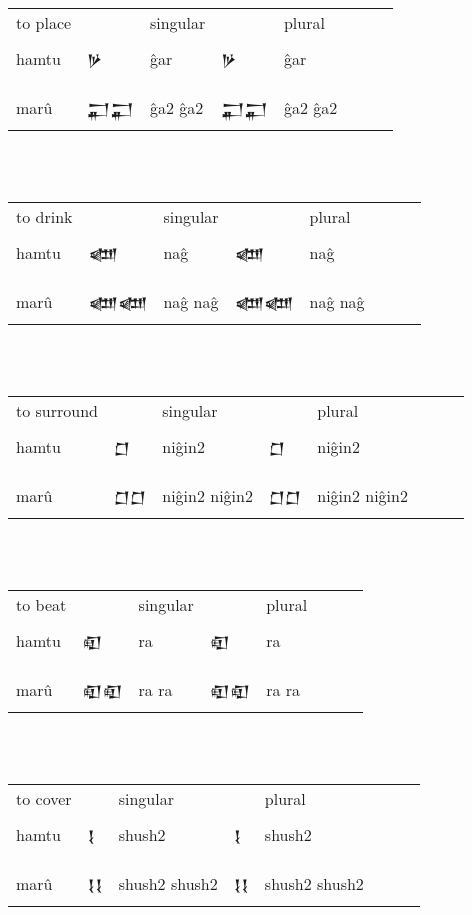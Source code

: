 \documentclass[a4paper,12pt]{book}
\newcommand{\fcm}{\large\setmainfont{Akkadian.otf}}
\begin{document}
\verb||\\
\begin{tabular}[!h]{l l l | l l l l l}
to place  && singular && plural \\
hamtu & {\fcm 𒃻}  & ĝar  & {\fcm 𒃻}  & ĝar \\
&&&&\\
  marû & {\fcm 𒂷𒂷}  & ĝa2 ĝa2 & {\fcm 𒂷𒂷}  & ĝa2 ĝa2 \\
\end{tabular}\verb||\\

\verb||\\
\begin{tabular}[!h]{l l l | l l l l l}
to drink  && singular && plural \\
  hamtu & {\fcm 𒅘}  & naĝ & {\fcm 𒅘}  & naĝ \\
&&&&\\
  marû & {\fcm 𒅘𒅘}  & naĝ naĝ & {\fcm 𒅘𒅘}  & naĝ naĝ \\
\end{tabular}\verb||\\

\verb||\\
\begin{tabular}[!h]{l l l | l l l l l}
to surround  && singular && plural \\
  hamtu & {\fcm 𒆸}  & niĝin2 & {\fcm 𒆸}   & niĝin2 \\
&&&&\\
  marû & {\fcm 𒆸𒆸}  & niĝin2 niĝin2 & {\fcm 𒆸𒆸} & niĝin2 niĝin2 \\
\end{tabular}\verb||\\


\verb||\\
\begin{tabular}[!h]{l l l | l l l l l}
to beat  && singular && plural \\
  hamtu & {\fcm 𒊏}  & ra & {\fcm 𒊏}  & ra \\
&&&&\\
  marû &{\fcm 𒊏𒊏}  & ra ra & {\fcm 𒊏𒊏}  & ra ra \\
\end{tabular}\verb||\\

\verb||\\
\begin{tabular}[!h]{l l l | l l l l l}
to cover  && singular && plural \\
  hamtu & {\fcm 𒋙}  & shush2 & {\fcm 𒋙}  & shush2 \\
&&&&\\
  marû &{\fcm 𒋙𒋙}  & shush2 shush2 & {\fcm 𒋙𒋙}  & shush2 shush2 \\
\end{tabular}\verb||\\
\end{document}
